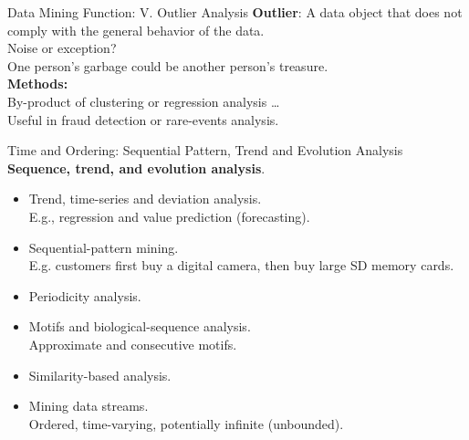\begin{frame}{Data Mining Function: V. Outlier Analysis}
	\textbf{Outlier}: A data object that does not comply with the general
	behavior of the data.\\[0.5cm]

	Noise or exception?\\
	One person's garbage could be another person's treasure.\\[0.5cm]

	\textbf{Methods:}\\
	By-product of clustering or regression analysis \ldots \\
	Useful in fraud detection or rare-events analysis.
\end{frame}

\begin{frame}{Time and Ordering: Sequential Pattern, Trend and Evolution
		Analysis}
	\textbf{Sequence, trend, and evolution analysis}.\\
	\begin{itemize}
		\item Trend, time-series and deviation analysis. \\
		      E.g., regression and value prediction (forecasting).
		\item Sequential-pattern mining.\\
		      E.g. customers first buy a digital camera, then buy large SD memory
		      cards.
		\item Periodicity analysis.
		\item Motifs and biological-sequence analysis.\\
		      Approximate and consecutive motifs.
		\item Similarity-based analysis.\\
		\item Mining data streams.\\
		      Ordered, time-varying, potentially infinite (unbounded).
	\end{itemize}
\end{frame}

